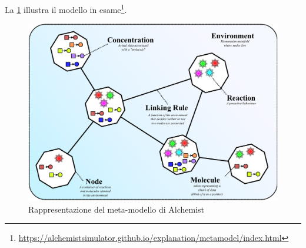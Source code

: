 La \cref{fig:alchemist-model} illustra il modello in esame\footnote{\url{https://alchemistsimulator.github.io/explanation/metamodel/index.html}}.

\begin{figure}
	\centering
	\includegraphics[width=.85\linewidth]{imgs/alchemist_meta_model.pdf}
	\caption{Rappresentazione del meta-modello di Alchemist}
	\label{fig:alchemist-model}
\end{figure}

